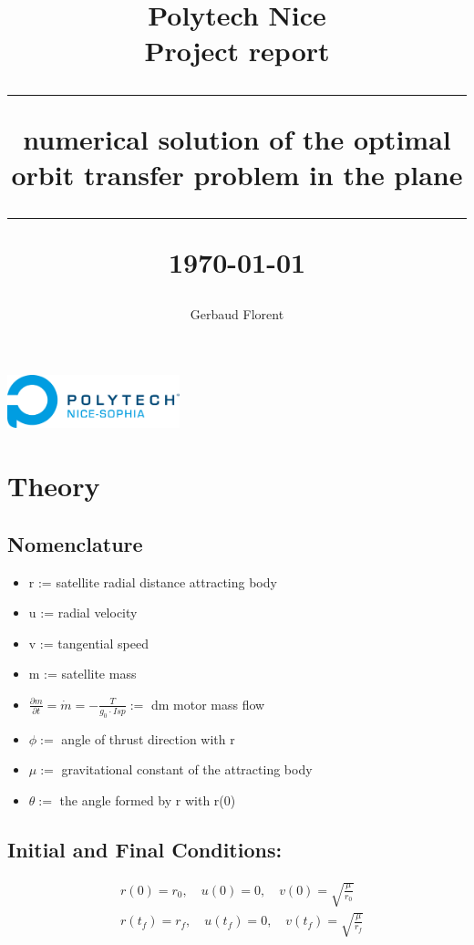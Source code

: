 \documentclass{article}
\title{\textbf{\Huge Polytech Nice}\\[1cm]
	\textbf{\LARGE Project report}\\[2cm]
	\hrule height 1pt
	\vspace{0.5cm}
	\textbf{\Large numerical solution of the optimal orbit transfer problem in the 
		plane}\\[0.5cm]
	\hrule height 1pt
	\vspace{3cm}
	\small{\today}}
\author{
	\begin{tabular}{c}
		Gerbaud Florent \\
	\end{tabular}
}
\date{}
\begin{document}
	\maketitle
	\vspace{3cm}
	\begin{center}
		\includegraphics[width=5cm]{Polytech.png}
	\end{center}
	\newpage %
	\renewcommand{\contentsname}{
		\hfill
		\begin{tikzpicture}
			\node[draw, fill=white, inner sep=20pt,line width=1.5pt] {\fontsize{30}{36}\selectfont\bfseries Table of Contents};
		\end{tikzpicture}
		\hfill
	}
	\tableofcontents
	\listofalgorithms
	\listoffigures
	\newpage
	
	\section{Theory}
	
	\subsection{Nomenclature}
	\begin{itemize}
		\item r := satellite radial distance attracting body
		\item u := radial velocity
		\item v := tangential speed
		\item m := satellite mass
		\item $\frac{\partial m}{\partial t} = \dot{m} = -\frac{T}{g_0 \cdot Isp} := $  dm motor mass flow
		\item $\phi := $ angle of thrust direction with r
		\item $\mu := $  gravitational constant of the attracting body
		\item $\theta := $ the angle formed by r with r(0)
	\end{itemize}
	
	\subsection{Initial and Final Conditions:}
	\[ \boxed{\begin{aligned}
			& r(0)=r_0, \quad u(0)=0, \quad v(0)=\sqrt{\frac{\mu}{r_0}} \\
			& r\left(t_f\right)=r_f, \quad u\left(t_f\right)=0, \quad v\left(t_f\right)=\sqrt{\frac{\mu}{r_f}}
	\end{aligned}} \]
	
\end{document}
